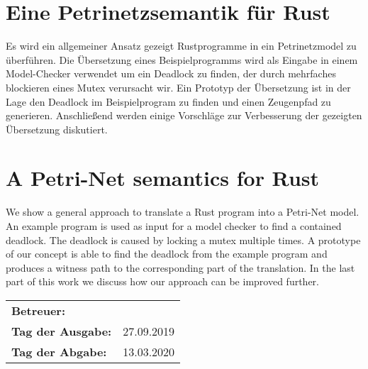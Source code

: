 \section*{Eine Petrinetzsemantik für Rust}
Es wird ein allgemeiner Ansatz gezeigt Rustprogramme in ein Petrinetzmodel zu überführen.
Die Übersetzung eines Beispielprogramms wird als Eingabe in einem Model-Checker verwendet um ein Deadlock zu finden, der durch mehrfaches blockieren eines Mutex verursacht wir.
Ein Prototyp der Übersetzung ist in der Lage den Deadlock im Beispielprogram zu finden und einen Zeugenpfad zu generieren.
Anschließend werden einige Vorschläge zur Verbesserung der gezeigten Übersetzung diskutiert.

\section*{A Petri-Net semantics for Rust}
We show a general approach to translate a Rust program into a Petri-Net model.
An example program is used as input for a model checker to find a contained deadlock.
The deadlock is caused by locking a mutex multiple times.
A prototype of our concept is able to find the deadlock from the example program and produces a witness path to the corresponding part of the translation.
In the last part of this work we discuss how our approach can be improved further.

\vfill

\begin{tabular}{ll}
	\bfseries Betreuer: & \parbox[t]{10cm}{\betreuer }\vspace{5mm} \\
	\bfseries Tag der Ausgabe: & 27.09.2019 \\
	\bfseries Tag der Abgabe: & 13.03.2020 \\
\end{tabular}
